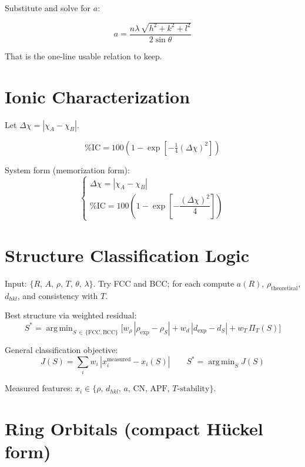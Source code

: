 \documentclass[11pt, letterpaper]{article}
\newcommand{\dhkl}{d_{hkl}}
\newcommand{\argmin}{\operatorname{arg\,min}}
\begin{document}
Substitute and solve for $a$:

\[
\boxed{a = \frac{n\lambda\,\sqrt{h^2+k^2+l^2}}{2\sin\theta}}
\]

That is the one-line usable relation to keep.

\section{Ionic Characterization}

Let $\Delta\chi = |\chi_A - \chi_B|$.

\[
\text{\%IC} = 100\!\left(1 - \exp\!\left[-\tfrac{1}{4}(\Delta\chi)^2\right]\right)
\]

System form (memorization form):
\[
\begin{cases}
  \Delta\chi = |\chi_A - \chi_B| \\[4pt]
  \text{\%IC} = 100\!\left(1 - \exp\!\left[-\dfrac{(\Delta\chi)^2}{4}\right]\right)
\end{cases}
\]

\section{Structure Classification Logic}

Input: $\{R,\,A,\,\rho,\,T,\,\theta,\,\lambda\}$.
Try FCC and BCC; for each compute $a(R)$, $\rho_{\mathrm{theoretical}}$,
$\dhkl$, and consistency with $T$.

Best structure via weighted residual:
\[
S^* = \argmin_{S\,\in\,\{\text{FCC},\text{BCC}\}}
\bigl[
  w_\rho\,|\rho_{\exp} - \rho_S|
  + w_d\,|d_{\exp} - d_S|
  + w_T\,\Pi_T(S)
\bigr]
\]

General classification objective:
\[
J(S) = \sum_i w_i\,|x_i^{\mathrm{measured}} - x_i(S)|
\qquad S^* = \argmin_S J(S)
\]

\noindent
Measured features: $x_i \in \{\rho,\,\dhkl,\,a,\,\mathrm{CN},\,\mathrm{APF},\,T\text{-stability}\}$.

\section{Ring Orbitals (compact Hückel form)}
\end{document}
